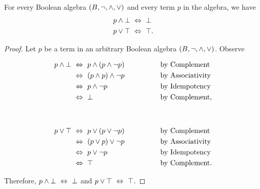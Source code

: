 \begin{theorem}[Domination]
    For every Boolean algebra $(B, \neg, \wedge, \vee)$ and every term $p$ in the algebra,
    we have
    \begin{align*}
        p \wedge \bot &~\Leftrightarrow~ \bot\\
        p \vee \top &~\Leftrightarrow~ \top.
    \end{align*}
\end{theorem}
\begin{proof}
    Let $p$ be a term in an arbitrary Boolean algebra $(B, \neg, \wedge, \vee)$.
    Observe
    \begin{center}
        \begin{minipage}{.45\linewidth}
            \begin{alignat*}{2}
                p \wedge \bot &~\Leftrightarrow~ p \wedge (p \wedge \neg p)~~~~~~~~~~~~&&\text{by Complement}\\
                             &~\Leftrightarrow~ (p \wedge p) \wedge \neg p &&\text{by Associativity}\\
                             &~\Leftrightarrow~ p \wedge \neg p &&\text{by Idempotency}\\
                             &~\Leftrightarrow~ \bot &&\text{by Complement},
            \end{alignat*}
        \end{minipage}%
        \begin{minipage}{.1\linewidth}
            ~
        \end{minipage}%
        \begin{minipage}{.45\linewidth}
            \begin{alignat*}{2}
                p \vee \top &~\Leftrightarrow~ p \vee (p \vee \neg p)~~~~~~~~~~~~&&\text{by Complement}\\
                             &~\Leftrightarrow~ (p \vee p) \vee \neg p &&\text{by Associativity}\\
                             &~\Leftrightarrow~ p \vee \neg p &&\text{by Idempotency}\\
                             &~\Leftrightarrow~ \top &&\text{by Complement}.
            \end{alignat*}
        \end{minipage}
    \end{center}
    Therefore, $p \wedge \bot ~\Leftrightarrow~ \bot$ and $p \vee \top ~\Leftrightarrow~ \top$.
\end{proof}

\newpage

